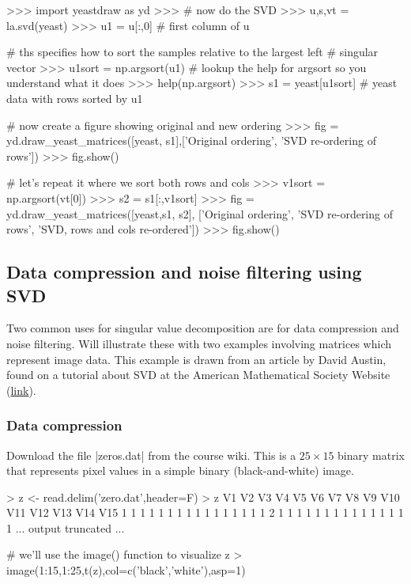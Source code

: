 \documentclass[11pt,letterpaper]{article}
\begin{document}
\begin{Pcode}
>>> import yeastdraw as yd    
>>> # now do the SVD   
>>> u,s,vt = la.svd(yeast)
>>> u1 = u[:,0] # first column of u

# ths specifies how to sort the samples relative to the largest left 
# singular vector
>>> u1sort = np.argsort(u1) 
# lookup the help for argsort so you understand what it does
>>> help(np.argsort)  
>>> s1 = yeast[u1sort] # yeast data with rows sorted by u1

# now create a figure showing original and new ordering
>>> fig = yd.draw_yeast_matrices([yeast, s1],['Original ordering',
                                             'SVD re-ordering of rows'])
>>> fig.show()

# let's repeat it where we sort both rows and cols
>>> v1sort = np.argsort(vt[0])
>>> s2 = s1[:,v1sort]
>>> fig = yd.draw_yeast_matrices([yeast,s1, s2],
        ['Original ordering', 'SVD re-ordering of rows',
        'SVD, rows and cols re-ordered'])
>>> fig.show()
\end{Pcode}

\subsection*{Data compression and noise filtering using SVD}

Two common uses for singular value decomposition are for data compression and noise filtering. Will illustrate these with two examples involving matrices which represent image data. This example is drawn from an article by David Austin, found on a tutorial about SVD at the American Mathematical Society Website (\href{http://www.ams.org/samplings/feature-column/fcarc-svd}{link}).

\subsubsection*{Data compression}

Download the file |zeros.dat| from the course wiki. This is a $25 \times 15$ binary matrix that represents pixel values in a simple binary (black-and-white) image.

\begin{Rcode}
> z <- read.delim('zero.dat',header=F)
> z
   V1 V2 V3 V4 V5 V6 V7 V8 V9 V10 V11 V12 V13 V14 V15
1   1  1  1  1  1  1  1  1  1   1   1   1   1   1   1
2   1  1  1  1  1  1  1  1  1   1   1   1   1   1   1
... output truncated ...

# we'll use the image() function to visualize z
> image(1:15,1:25,t(z),col=c('black','white'),asp=1)    
\end{Rcode}
\end{document}
